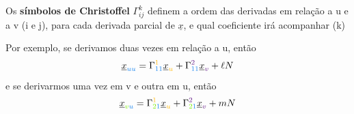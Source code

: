 \documentclass[../differential_geometry.tex]{subfiles}
\begin{document}
\begin{def*}
	Os \textbf{símbolos de Christoffel} \(\Gamma_{ij}^{k}\) definem a ordem das derivadas em relação a u e a v (i e j), para cada derivada parcial de \(\underline{x}\), e qual coeficiente irá acompanhar (k)
\end{def*}
Por exemplo, se derivamos duas vezes em relação a u, então
\[
	\underline{x}_{{\color{DodgerBlue2}uu}} = \Gamma_{{\color{DodgerBlue2}11}}^{{\color{DarkGoldenrod1}1}}\underline{x}_{{\color{DarkGoldenrod1}u}} + \Gamma_{{\color{DodgerBlue2}11}}^{{\color{DarkOrchid4}2}}\underline{x}_{{\color{DarkOrchid4}v}} + \ell N
\]
e se derivarmos uma vez em v e outra em u, então
\[
	\underline{x}_{{\color{Chartreuse2}v}{\color{DodgerBlue2}u}} = \Gamma_{{\color{Chartreuse2}2}{\color{DodgerBlue2}1}}^{{\color{DarkGoldenrod1}1}}\underline{x}_{{\color{DarkGoldenrod1}u}} + \Gamma_{{\color{Chartreuse2}2}{\color{DodgerBlue2}1}}^{{\color{DarkOrchid4}2}}\underline{x}_{{\color{DarkOrchid4}v}}+mN
\]
\end{document}
